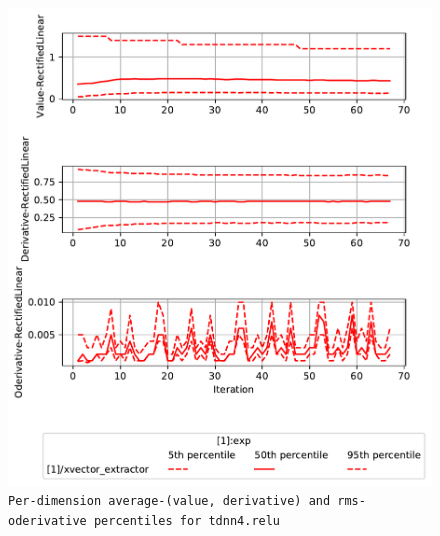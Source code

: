 \documentclass[prl,10pt,twocolumn]{revtex4}
\begin{document}
\newpage
\begin{figure}[h]
  \begin{center}
    \caption{\texttt{Per-dimension average-(value, derivative) and rms-oderivative percentiles for tdnn4.relu}}
    \includegraphics[width=\textwidth]{exp/xvector_extractor/report/nonlinstats_tdnn4_dot_relu.pdf}
  \end{center}
\end{figure}
\clearpage
\end{document}
